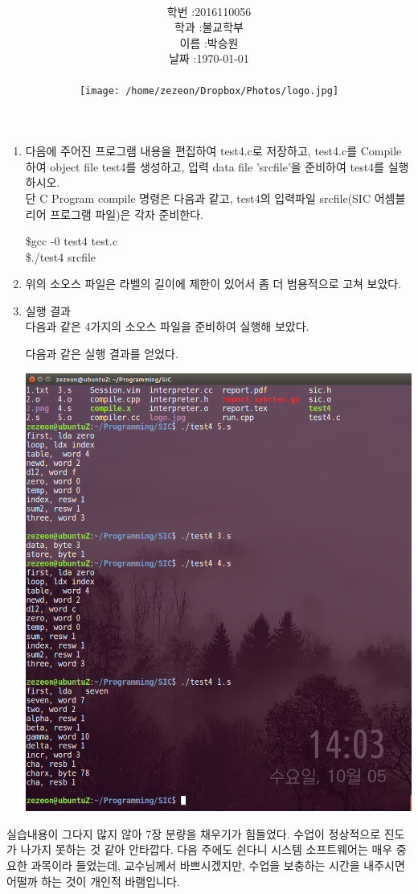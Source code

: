 \documentclass[12pt,a4paper]{article}
\title{
	\centering
	\pgfornament[width=12cm,color=teal]{84}\\
	\vspace{1cm}
	\fontsize{50}{50} \selectfont {시스템 S/W 실습4}\\
	\pgfornament[width=12cm,color=teal]{88}\\
	\vfill}
\author{
	\LARGE
	\begin{tabular}{rl}
		\hline
		학번 : & 2016110056\\ 
		학과 : & 불교학부 \\
		이름 : & 박승원\\
		날짜 : & \today\\
		\hline
	\end{tabular}\vspace{2cm}
	\\
	\texttt{[image: /home/zezeon/Dropbox/Photos/logo.jpg]}
}
\date{}
\begin{document}
\maketitle
\noindent
\lstset{columns=flexible, tabsize=4, frame=single, showstringspaces=false, breaklines=true, upquote=true, basicstyle=\ttfamily\normal}
\begin{enumerate}


\lstset{language=C}
\item 다음에 주어진 프로그램 내용을 편집하여 test4.c로 저장하고, test4.c를 Compile 하여 object file test4를 생성하고, 입력 data file 'srcfile'을 준비하여 test4를 실행하시오. \\
단 C Program compile 명령은 다음과 같고, test4의 입력파일 srcfile(SIC 어셈블리어 프로그램 파일)은 각자 준비한다.

\$gcc -0 test4 test.c\\
\$./test4 srcfile



\item 위의 소오스 파일은 라벨의 길이에 제한이 있어서 좀 더 범용적으로 고쳐 보았다.



\item 실행 결과
\\다음과 같은 4가지의 소오스 파일을 준비하여 실행해 보았다.


다음과 같은 실행 결과를 얻었다.

\includegraphics[width=\textwidth]{1.png}

\end{enumerate}

{}
\indent
실습내용이 그다지 많지 않아 7장 분량을 채우기가 힘들었다. 수업이 정상적으로 진도가 나가지 못하는 것 같아 안타깝다. 다음 주에도 쉰다니 시스템 소프트웨어는 매우 중요한 과목이라 들었는데, 교수님께서 바쁘시겠지만, 수업을 보충하는 시간을 내주시면 어떨까 하는 것이 개인적 바램입니다.
\end{document}
